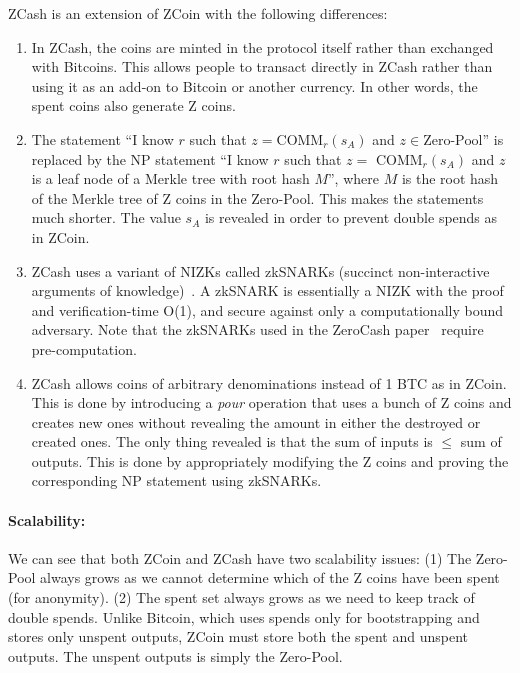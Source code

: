 \documentclass[]{report}   %
\begin{document}
ZCash is an extension of ZCoin with the following differences:
\begin{enumerate}
	\item In ZCash, the coins are minted in the protocol itself rather than exchanged with Bitcoins. This allows people to transact directly in ZCash rather than using it as an add-on to Bitcoin or another currency. In other words, the spent coins also generate Z coins.
	\item The statement  ``I know $r$ such that $z=\text{COMM}_r(s_A)$ and $z \in \text{Zero-Pool}$'' is replaced by the NP statement  ``I know $r$ such that $z =$ COMM$_r(s_A)$ and $z$ is a leaf node of a Merkle tree with root hash $M$'', where $M$ is the root hash of the Merkle tree of Z coins in the Zero-Pool. This makes the statements much shorter. The value $s_A$ is revealed in order to prevent double spends as in ZCoin.

	\item ZCash uses a variant of NIZKs called zkSNARKs (succinct non-interactive arguments of knowledge)~\cite{cryptoeprint:2013:879,ben2013snarks}. A zkSNARK is essentially a NIZK with the proof and verification-time O(1), and secure against only a computationally bound adversary. Note that the zkSNARKs used in the ZeroCash paper~\cite{sasson2014zerocash} require pre-computation. %

	\item ZCash allows coins of arbitrary denominations instead of 1 BTC as in ZCoin. This is done by introducing a {\em pour} operation that uses a bunch of Z coins and creates new ones without revealing the amount in either the destroyed or created ones. The only thing revealed is that the sum of inputs is $\leq$ sum of outputs. This is done by appropriately modifying the Z coins and proving the corresponding NP statement using zkSNARKs. \end{enumerate}

\paragraph{Scalability:} We can see that both ZCoin and ZCash have two scalability issues: (1) The Zero-Pool always grows as we cannot determine which of the Z coins have been spent (for anonymity). (2) The spent set always grows as we need to keep track of double spends. Unlike Bitcoin, which uses spends only for bootstrapping and stores only unspent outputs, ZCoin must store both the spent and unspent outputs. The unspent outputs is simply the Zero-Pool.
\end{document}
